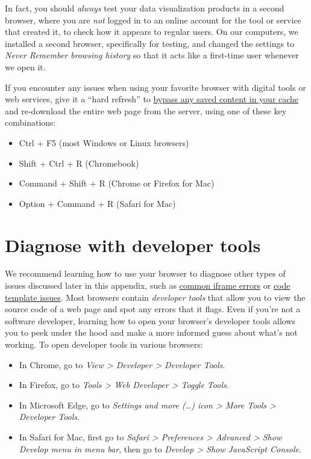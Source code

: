 \documentclass[
  english,
]{book}
\providecommand{\tightlist}{%
  \setlength{\itemsep}{0pt}\setlength{\parskip}{0pt}}
\begin{document}
In fact, you should \emph{always} test your data visualization products in a second browser, where you are \emph{not} logged in to an online account for the tool or service that created it, to check how it appears to regular users. On our computers, we installed a second browser, specifically for testing, and changed the settings to \emph{Never Remember browsing history} so that it acts like a first-time user whenever we open it.

If you encounter any issues when using your favorite browser with digital tools or web services, give it a ``hard refresh'' to \href{https://en.wikipedia.org/wiki/Wikipedia:Bypass_your_cache}{bypass any saved content in your cache} and re-download the entire web page from the server, using one of these key combinations:

\begin{itemize}
\tightlist
\item
  Ctrl + F5 (most Windows or Linux browsers)
\item
  Shift + Ctrl + R (Chromebook)
\item
  Command + Shift + R (Chrome or Firefox for Mac)
\item
  Option + Command + R (Safari for Mac)
\end{itemize}

\hypertarget{fix-developer-tools}{%
\section{Diagnose with developer tools}\label{fix-developer-tools}}

We recommend learning how to use your browser to diagnose other types of issues discussed later in this appendix, such as \href{fix-iframe.html}{common iframe errors} or \href{fix-code.html}{code template issues}. Most browsers contain \emph{developer tools} that allow you to view the source code of a web page and spot any errors that it flags. Even if you're not a software developer, learning how to open your browser's developer tools allows you to peek under the hood and make a more informed guess about what's not working. To open developer tools in various browsers:

\begin{itemize}
\tightlist
\item
  In Chrome, go to \emph{View \textgreater{} Developer \textgreater{} Developer Tools}.
\item
  In Firefox, go to \emph{Tools \textgreater{} Web Developer \textgreater{} Toggle Tools}.
\item
  In Microsoft Edge, go to \emph{Settings and more (\ldots) icon \textgreater{} More Tools \textgreater{} Developer Tools}.
\item
  In Safari for Mac, first go to \emph{Safari \textgreater{} Preferences \textgreater{} Advanced \textgreater{} Show Develop menu in menu bar}, then go to \emph{Develop \textgreater{} Show JavaScript Console}.
\end{itemize}
\end{document}
